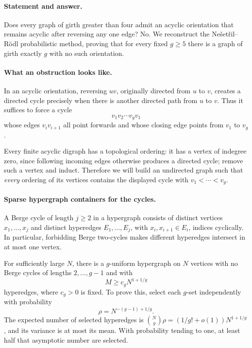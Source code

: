 \paragraph{Statement and answer.}
Does every graph of girth greater than four admit an acyclic orientation that remains acyclic after reversing any one edge? No. We reconstruct the Ne\v{s}et\v{r}il--R\"odl probabilistic method, proving that for every fixed \(g\geq5\) there is a graph of girth exactly \(g\) with no such orientation.

\paragraph{What an obstruction looks like.}
In an acyclic orientation, reversing \(uv\), originally directed from \(u\) to \(v\), creates a directed cycle precisely when there is another directed path from \(u\) to \(v\). Thus it suffices to force a cycle
\[
 v_1v_2\cdots v_gv_1
\]
whose edges \(v_iv_{i+1}\) all point forwards and whose closing edge points from \(v_1\) to \(v_g\).

Every finite acyclic digraph has a topological ordering: it has a vertex of indegree zero, since following incoming edges otherwise produces a directed cycle; remove such a vertex and induct. Therefore we will build an undirected graph such that \emph{every} ordering of its vertices contains the displayed cycle with \(v_1<\cdots<v_g\).

\paragraph{Sparse hypergraph containers for the cycles.}
A Berge cycle of length \(j\geq2\) in a hypergraph consists of distinct vertices \(x_1,\ldots,x_j\) and distinct hyperedges \(E_1,\ldots,E_j\), with \(x_i,x_{i+1}\in E_i\), indices cyclically. In particular, forbidding Berge two-cycles makes different hyperedges intersect in at most one vertex.

For sufficiently large \(N\), there is a \(g\)-uniform hypergraph on \(N\) vertices with no Berge cycles of lengths \(2,\ldots,g-1\) and with
\[
 M\geq c_gN^{1+1/g}
\tag{1}
\]
hyperedges, where \(c_g>0\) is fixed. To prove this, select each \(g\)-set independently with probability
\[
 \rho=N^{-(g-1)+1/g}.
\]
The expected number of selected hyperedges is
\(\binom Ng\rho=(1/g!+o(1))N^{1+1/g}\), and its variance is at most its mean. With probability tending to one, at least half that asymptotic number are selected.

